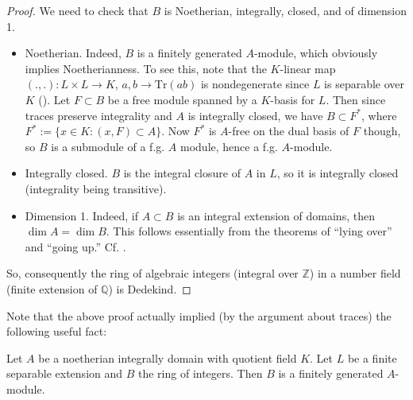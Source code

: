 \begin{proof}  We need to check that $B$ is Noetherian, integrally, closed, and of dimension 1.

\begin{itemize}
\item Noetherian.  Indeed, $B$ is a finitely generated $A$-module, which
obviously implies Noetherianness. To see this, note that the $K$-linear map
$(.,.): L \times L \to K$, $a,b \to \mathrm{Tr}(ab)$ is nondegenerate since
$L$ is separable over $K$ (\rref{}).  Let $F \subset B$ be a free module spanned by a $K$-basis for $L$.  Then since traces preserve integrality and $A$ is integrally closed, we have $B \subset F^*$, where $F^* := \{ x \in K: (x,F) \subset A \}$.  Now $F^*$ is $A$-free on the dual basis of $F$ though, so $B$ is a submodule of a f.g. $A$ module, hence a f.g. $A$-module.
\item Integrally closed.  $B$ is the integral closure of $A$ in $L$, so it
is integrally closed (integrality being transitive).
\item Dimension 1.  Indeed, if $A \subset B$ is an integral extension of
domains, then $\dim A = \dim B$. This follows essentially from the theorems of
``lying over'' and ``going up.'' Cf. \cite{Ei95}.
\end{itemize}

So, consequently the ring of algebraic integers (integral over $\mathbb{Z}$) in a number field (finite extension of $\mathbb{Q}$) is Dedekind.
\end{proof}



Note that the above proof actually implied (by the argument about traces) the following useful fact:
\begin{proposition} Let $A$ be a noetherian integrally domain with quotient field $K$.  Let $L$ be a finite separable extension and $B$ the ring of integers. Then $B$ is a finitely generated $A$-module.
\end{proposition}

